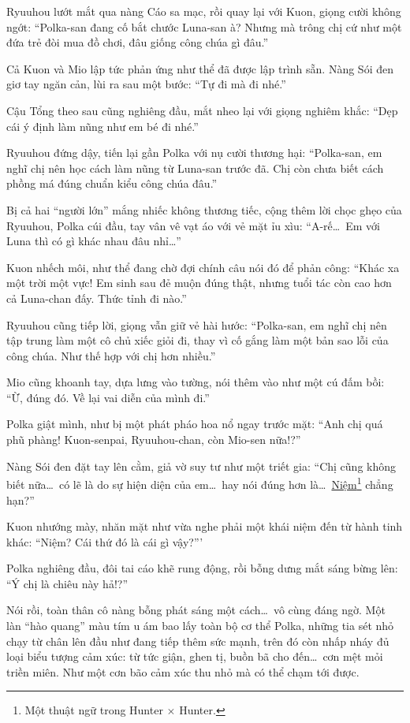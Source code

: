 \documentclass[../main.tex]{subfiles}
\begin{document}
Ryuuhou lướt mắt qua nàng Cáo sa mạc, rồi quay lại với Kuon, giọng cười không ngớt: ``Polka-san đang cố bắt chước Luna-san à? Nhưng mà trông chị cứ như một đứa trẻ đòi mua đồ chơi, đâu giống công chúa gì đâu.''

Cả Kuon và Mio lập tức phản ứng như thể đã được lập trình sẵn. Nàng Sói đen giơ tay ngăn cản, lùi ra sau một bước: ``Tự đi mà đi nhé.''

Cậu Tổng theo sau cũng nghiêng đầu, mắt nheo lại với giọng nghiêm khắc: ``Dẹp cái ý định làm nũng như em bé đi nhé.''

Ryuuhou đứng dậy, tiến lại gần Polka với nụ cười thương hại: ``Polka-san, em nghĩ chị nên học cách làm nũng từ Luna-san trước đã. Chị còn chưa biết cách phồng má đúng chuẩn kiểu công chúa đâu.''

Bị cả hai ``người lớn'' mắng nhiếc không thương tiếc, cộng thêm lời chọc ghẹo của Ryuuhou, Polka cúi đầu, tay vân vê vạt áo với vẻ mặt ỉu xìu: ``A-rế\dots\ Em với Luna thì có gì khác nhau đâu nhỉ\dots''

Kuon nhếch môi, như thể đang chờ đợi chính câu nói đó để phản công: ``Khác xa một trời một vực! Em sinh sau đẻ muộn đúng thật, nhưng tuổi tác còn cao hơn cả Luna-chan đấy. Thức tỉnh đi nào.''

Ryuuhou cũng tiếp lời, giọng vẫn giữ vẻ hài hước: ``Polka-san, em nghĩ chị nên tập trung làm một cô chủ xiếc giỏi đi, thay vì cố gắng làm một bản sao lỗi của công chúa. Như thế hợp với chị hơn nhiều.''

Mio cũng khoanh tay, dựa lưng vào tường, nói thêm vào như một cú đấm bồi: ``Ừ, đúng đó. Về lại vai diễn của mình đi.''

Polka giật mình, như bị một phát pháo hoa nổ ngay trước mặt: ``Anh chị quá phũ phàng! Kuon-senpai, Ryuuhou-chan, còn Mio-sen nữa!?''

Nàng Sói đen đặt tay lên cằm, giả vờ suy tư như một triết gia: ``Chị cũng không biết nữa\dots\ có lẽ là do sự hiện diện của em\dots\ hay nói đúng hơn là\dots\ \underline{Niệm}\footnote{Một thuật ngữ trong Hunter $\times$ Hunter.} chẳng hạn?''

Kuon nhướng mày, nhăn mặt như vừa nghe phải một khái niệm đến từ hành tinh khác: ``Niệm? Cái thứ đó là cái gì vậy?'''

Polka nghiêng đầu, đôi tai cáo khẽ rung động, rồi bỗng dưng mắt sáng bừng lên: ``Ý chị là chiêu này hả!?''

Nói rồi, toàn thân cô nàng bỗng phát sáng một cách\dots\ vô cùng đáng ngờ. Một làn ``hào quang'' màu tím u ám bao lấy toàn bộ cơ thể Polka, những tia sét nhỏ chạy từ chân lên đầu như đang tiếp thêm sức mạnh, trên đó còn nhấp nháy đủ loại biểu tượng cảm xúc: từ tức giận, ghen tị, buồn bã cho đến\dots\ cơn mệt mỏi triền miên. Như một cơn bão cảm xúc thu nhỏ mà có thể chạm tới được.
\end{document}
